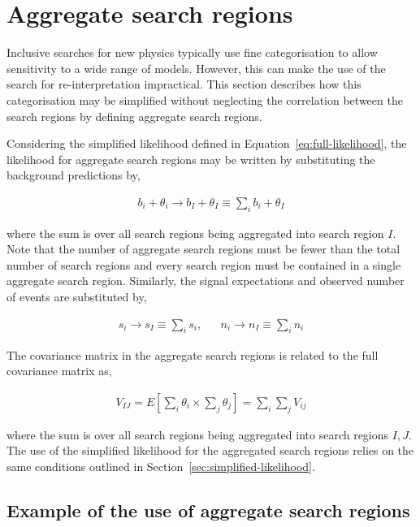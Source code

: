 \section{Aggregate search regions}
\label{sec:aggregate-signal-regions}

Inclusive searches for new physics typically use fine categorisation to allow
sensitivity to a wide range of models. However, this can make the use
of the search for re-interpretation impractical. 
This section describes how this categorisation may be simplified without neglecting the correlation 
between the search regions by defining aggregate search regions.

Considering the simplified likelihood defined in Equation~\ref{eq:full-likelihood},
the likelihood for aggregate search regions may be written by substituting the 
background predictions by,

\begin{align}
b_{i} + \theta_i \rightarrow b_I + \theta_I \equiv \sum_{i}b_{i} + \theta_I
\label{eq:b-agg}
\end{align}

where the sum is over all search regions being aggregated into search region $I$.
Note that the number of aggregate search regions must be fewer than the total number of search regions and 
every search region must be contained in a single aggregate search region. 
Similarly, the signal expectations and observed number of events are substituted by, 

\begin{align}
 s_{i}  \rightarrow s_{I} \equiv \sum_{i}s_{i},  &&  n_{i}  \rightarrow n_{I} \equiv \sum_{i}n_{i} 
\label{eq:b-agg}
\end{align}


The covariance matrix in the aggregate search regions is related to the full covariance matrix as, 

\begin{align}
V_{IJ}=E[\sum_{i}\theta_{i}\times\sum_{j}\theta_{j}] = \sum_{i}\sum_{j}V_{ij}
\label{eq:agg-cov}
\end{align}

where the sum is over all search regions being aggregated into search regions $I,J$.  The use of the simplified likelihood 
for the aggregated search regions relies on the same conditions outlined in Section~\ref{sec:simplified-likelihood}. 

\subsection{Example of the use of aggregate search regions}
\label{sec:agg-toy}

